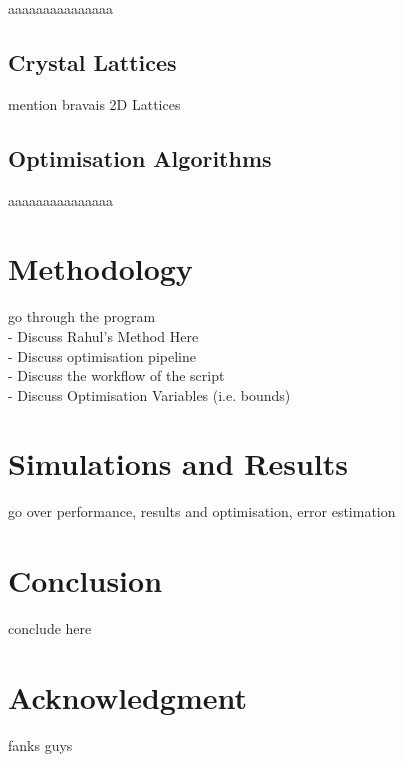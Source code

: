 \documentclass[conference]{IEEEtran}
\begin{document}
aaaaaaaaaaaaaaa

\subsection{Crystal Lattices}

mention bravais 2D Lattices

\subsection{Optimisation Algorithms}

aaaaaaaaaaaaaaa


\section{Methodology}

go through the program\\
- Discuss Rahul's Method Here\\
- Discuss optimisation pipeline\\
- Discuss the workflow of the script \\
- Discuss Optimisation Variables (i.e. bounds)\\

\section{Simulations and Results}

go over performance, results and optimisation, error estimation

\section{Conclusion}

conclude here

\section*{Acknowledgment}

fanks guys
\end{document}
